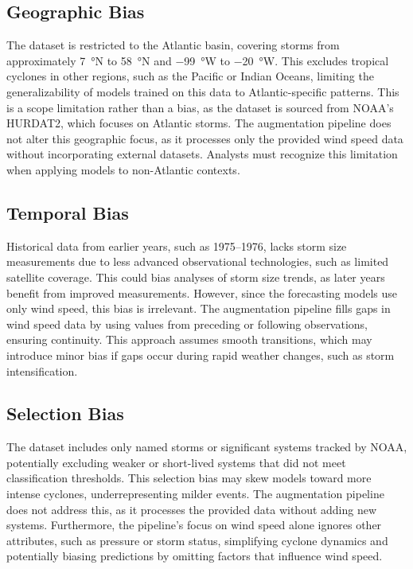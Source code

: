 \subsection{Geographic Bias}
The dataset is restricted to the Atlantic basin, covering storms from approximately \SI{7}{\degree}N to \SI{58}{\degree}N and \SI{-99}{\degree}W to \SI{-20}{\degree}W. This excludes tropical cyclones in other regions, such as the Pacific or Indian Oceans, limiting the generalizability of models trained on this data to Atlantic-specific patterns. This is a scope limitation rather than a bias, as the dataset is sourced from NOAA’s HURDAT2, which focuses on Atlantic storms. The augmentation pipeline does not alter this geographic focus, as it processes only the provided wind speed data without incorporating external datasets. Analysts must recognize this limitation when applying models to non-Atlantic contexts.

\subsection{Temporal Bias}
Historical data from earlier years, such as 1975--1976, lacks storm size measurements due to less advanced observational technologies, such as limited satellite coverage. This could bias analyses of storm size trends, as later years benefit from improved measurements. However, since the forecasting models use only wind speed, this bias is irrelevant. The augmentation pipeline fills gaps in wind speed data by using values from preceding or following observations, ensuring continuity. This approach assumes smooth transitions, which may introduce minor bias if gaps occur during rapid weather changes, such as storm intensification.

\subsection{Selection Bias}
The dataset includes only named storms or significant systems tracked by NOAA, potentially excluding weaker or short-lived systems that did not meet classification thresholds. This selection bias may skew models toward more intense cyclones, underrepresenting milder events. The augmentation pipeline does not address this, as it processes the provided data without adding new systems. Furthermore, the pipeline’s focus on wind speed alone ignores other attributes, such as pressure or storm status, simplifying cyclone dynamics and potentially biasing predictions by omitting factors that influence wind speed.

